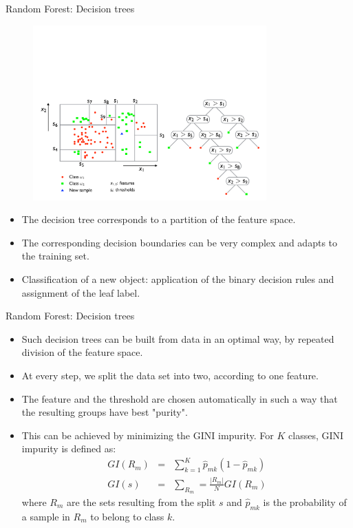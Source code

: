 \documentclass[xcolor=pdftex,dvipsnames,table]{beamer}
\begin{document}
\begin{frame}{Random Forest: Decision trees}
\begin{figure}[htb]
\includegraphics[width=0.8\textwidth]{../graphics/RF2.pdf}
\end{figure}

\begin{itemize}
	\item The decision tree corresponds to a partition of the feature space. 
	\item The corresponding decision boundaries can be very complex and adapts to the training set.
	\item Classification of a new object: application of the binary decision rules and assignment of the leaf label.
\end{itemize}
	
\end{frame}

\begin{frame}{Random Forest: Decision trees}
\begin{itemize}
\item Such decision trees can be built from data in an optimal way, by repeated division of the feature space. 
\item At every step, we split the data set into two, according to one feature. 
\item The feature and the threshold are chosen automatically in such a way that the resulting groups have best "purity".
\item This can be achieved by minimizing the GINI impurity. For $K$ classes, GINI impurity is defined as:
\begin{eqnarray*}
GI(R_m) &=& \sum_{k=1}^{K}\hat{p}_{mk}(1-\hat{p}_{mk}) \\
GI(s) &=& \sum_{R_m}=\frac{|R_m|}{N}GI(R_m)
\end{eqnarray*}
where $R_m$ are the sets resulting from the split $s$ and $\hat{p}_{mk}$ is the probability of a sample in $R_m$ to belong to class $k$.
\end{itemize}
\end{frame}
\end{document}
